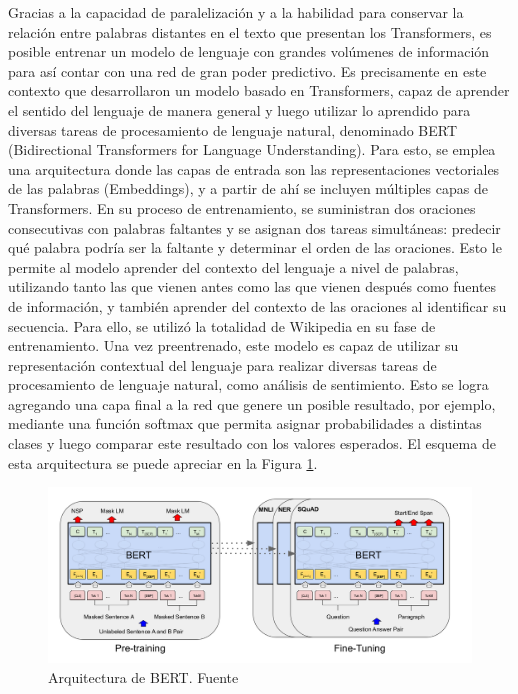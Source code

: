 Gracias a la capacidad de paralelización y a la habilidad para conservar la relación entre palabras distantes en el texto que presentan los Transformers, es posible entrenar un modelo de lenguaje con grandes volúmenes de información para así contar con una red de gran poder predictivo. Es precisamente en este contexto que \cite{devlin2018bert} desarrollaron un modelo basado en Transformers, capaz de aprender el sentido del lenguaje de manera general y luego utilizar lo aprendido para diversas tareas de procesamiento de lenguaje natural, denominado BERT (Bidirectional Transformers for Language Understanding). Para esto, se emplea una arquitectura donde las capas de entrada son las representaciones vectoriales de las palabras (Embeddings), y a partir de ahí se incluyen múltiples capas de Transformers. En su proceso de entrenamiento, se suministran dos oraciones consecutivas con palabras faltantes y se asignan dos tareas simultáneas: predecir qué palabra podría ser la faltante y determinar el orden de las oraciones. Esto le permite al modelo aprender del contexto del lenguaje a nivel de palabras, utilizando tanto las que vienen antes como las que vienen después como fuentes de información, y también aprender del contexto de las oraciones al identificar su secuencia. Para ello, se utilizó la totalidad de Wikipedia en su fase de entrenamiento. Una vez preentrenado, este modelo es capaz de utilizar su representación contextual del lenguaje para realizar diversas tareas de procesamiento de lenguaje natural, como análisis de sentimiento. Esto se logra agregando una capa final a la red que genere un posible resultado, por ejemplo, mediante una función softmax que permita asignar probabilidades a distintas clases y luego comparar este resultado con los valores esperados. El esquema de esta arquitectura se puede apreciar en la Figura \ref{figure:BERT}.

\begin{figure}[t]
	\centering
	\includegraphics[scale=0.35]{Images & Logos/BERT.png} 
	\caption{Arquitectura de BERT. Fuente \cite{devlin2018bert}}
	\label{figure:BERT}
\end{figure}


